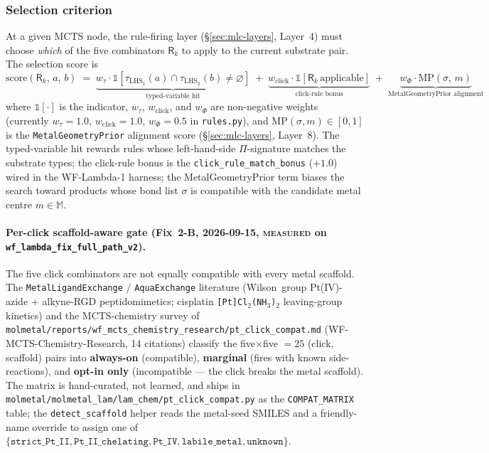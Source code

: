 \subsubsection{Selection criterion}
\label{sec:click-chem-selection}

At a given MCTS node, the rule-firing layer
(\S\ref{sec:mlc-layers}, Layer~4) must choose \emph{which} of
the five combinators $\mathsf{R}_{k}$ to apply to the current
substrate pair. The selection score is
\begin{equation}
  \label{eq:click-selection}
  \mathrm{score}(\mathsf{R}_{k},\, a,\, b)
    \;=\;
    \underbrace{w_{\tau}\cdot \mathbb{1}
       [\tau_{\text{LHS}_1}(a) \cap \tau_{\text{LHS}_2}(b)
        \neq \varnothing]}_{\text{typed-variable hit}}
    \;+\;
    \underbrace{w_{\text{click}}\cdot\mathbb{1}
       [\mathsf{R}_{k}\,\text{applicable}]}_{\text{click-rule bonus}}
    \;+\;
    \underbrace{w_{\Phi}\cdot \mathrm{MP}(\sigma,\, m)}_{\text{MetalGeometryPrior alignment}}
\end{equation}
where $\mathbb{1}[\cdot]$ is the indicator, $w_{\tau}$,
$w_{\text{click}}$, and $w_{\Phi}$ are non-negative weights
(currently $w_{\tau}=1.0$, $w_{\text{click}}=1.0$, $w_{\Phi}=0.5$
in \texttt{rules.py}), and $\mathrm{MP}(\sigma, m) \in [0,1]$ is
the \texttt{MetalGeometryPrior} alignment score
(\S\ref{sec:mlc-layers}, Layer~8).
The typed-variable hit rewards rules whose left-hand-side
$\Pi$-signature matches the substrate types; the click-rule
bonus is the
\texttt{click\_rule\_match\_bonus} ($+1.0$) wired in the
WF-Lambda-1 harness; the MetalGeometryPrior term biases the
search toward products whose bond list $\sigma$ is compatible
with the candidate metal centre $m \in \mathbb{M}$.

\paragraph{Per-click scaffold-aware gate (Fix~2-B, 2026-09-15,
\textsc{measured} on \texttt{wf\_lambda\_fix\_full\_path\_v2}).}
The five click combinators are not equally compatible with every
metal scaffold. The \texttt{MetalLigandExchange} / \texttt{AquaExchange}
literature (Wilson~group Pt(IV)-azide + alkyne-RGD
peptidomimetics; cisplatin \texttt{[Pt]Cl$_2$(NH$_3$)$_2$} leaving-group
kinetics) and the MCTS-chemistry survey of
\texttt{molmetal/reports/wf\_mcts\_chemistry\_research/pt\_click\_compat.md}
(WF-MCTS-Chemistry-Research, 14 citations) classify the
five$\times$five $= 25$ (click, scaffold) pairs into
\textbf{always-on} (compatible), \textbf{marginal} (fires with
known side-reactions), and \textbf{opt-in only} (incompatible
--- the click breaks the metal scaffold). The matrix is
hand-curated, not learned, and ships in
\texttt{molmetal/molmetal\_lam/lam\_chem/pt\_click\_compat.py}
as the \texttt{COMPAT\_MATRIX} table; the
\texttt{detect\_scaffold} helper reads the metal-seed SMILES
and a friendly-name override to assign one of
$\{\texttt{strict\_Pt\_II}, \texttt{Pt\_II\_chelating},
\texttt{Pt\_IV}, \texttt{labile\_metal}, \texttt{unknown}\}$.

